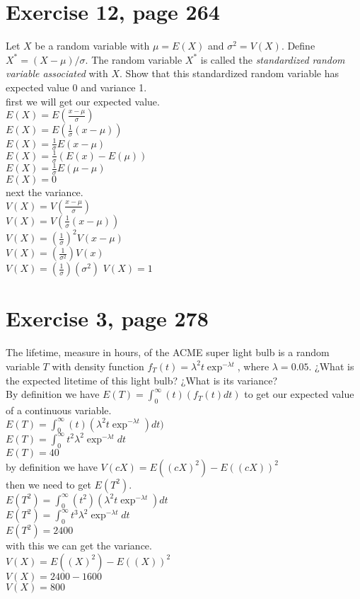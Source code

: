 \documentclass[]{article}
\begin{document}
\section{Exercise 12, page 264}
Let $X$ be a random variable with $\mu = E(X)$ and $\sigma^{2} = V(X)$. Define $X^{*} = (X- \mu)/\sigma$. The random variable $X^{*}$ is called the \textit{standardized random variable associated} with $X$. Show that this standardized random variable has expected value 0 and variance 1.\\
first we will get our expected value.\\
$E(X) = E(\frac{x-\mu}{\sigma})$\\
$E(X) = E(\frac{1}{\sigma}(x-\mu))$\\
$E(X) = \frac{1}{\sigma}E(x-\mu)$\\
$E(X) = \frac{1}{\sigma}(E(x)-E(\mu))$\\
$E(X) = \frac{1}{\sigma}E(\mu-\mu)$\\
$E(X) = 0$\\
next the variance.\\
$V(X)= V(\frac{x-\mu}{\sigma})$\\
$V(X)= V(\frac{1}{\sigma}(x-\mu))$\\
$V(X)= (\frac{1}{\sigma})^{2} V(x - \mu)$\\
$V(X)= (\frac{1}{\sigma^{2}}) V(x)$\\
$V(X)= (\frac{1}{\sigma})(\sigma^{2})$
$V(X)= 1$




\section{Exercise 3, page 278}
The lifetime, measure in hours, of the ACME super light bulb is a random variable $T$ with density function $f_{T}(t) = \lambda ^{2}t\exp^{-\lambda t}$, where $ \lambda = 0.05$. ¿What is the expected litetime of this light bulb? ¿What is its variance?\\
By definition we have $E(T) = \int_{0}^{\infty}(t)(f_{T}(t)dt)$ to get our expected value of a continuous variable.\\
$E(T) = \int_{0}^{\infty}(t)(\lambda ^{2}t\exp^{-\lambda t})dt)$\\
$E(T) = \int_{0}^{\infty}t^{2}\lambda ^{2}\exp^{-\lambda t}dt$\\
$E(T) = 40$\\
by definition we have $V(cX) = E((cX)^{2})-E((cX))^{2}$\\
then we need to get $E(T^{2})$.\\
$E(T^{2}) = \int_{0}^{\infty}(t^{2})(\lambda ^{2}t\exp^{-\lambda t})dt$\\
$E(T^{2}) = \int_{0}^{\infty}t^{3}\lambda ^{2}\exp^{-\lambda t}dt$\\
$E(T^{2}) = 2400$\\
with this we can get the variance.\\
$V(X) = E((X)^{2})-E((X))^{2}$\\
$V(X) = 2400 - 1600$\\
$V(X) = 800$\\
\end{document}
